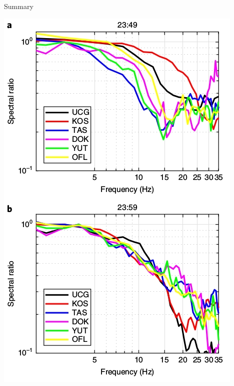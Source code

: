 \documentclass[aspectratio=43,9pt]{beamer}
\begin{document}
\begin{frame}{Summary}
 
 \includegraphics{Figs/fig_4ells.jpg}
 
\end{frame}
\end{document}
